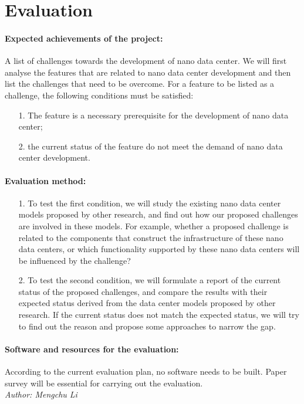 \documentclass[sigchi-a, authorversion]{acmart}
\begin{document}
\section{Evaluation} %

\paragraph{Expected achievements of the project:} A list of challenges towards the development of nano data center.
We will first analyse the features that are related to nano data center development and then list the challenges that need to be overcome. 
For a feature to be listed as a challenge, 
the following conditions must be satisfied:
\begin{enumerate}
\item[1.] The feature is a necessary prerequisite for the development of nano data center;
\item[2.] the current status of the feature do not meet the demand of nano data center development. 
\end{enumerate}

\paragraph{Evaluation method:} 
\begin{enumerate}
\item[1.] To test the first condition, 
we will study the existing nano data center models proposed by other research, 
and find out how our proposed challenges are involved in these models. 
For example, whether a proposed challenge is related to the components that construct the infrastructure of these nano data centers,
or which functionality supported by these nano data centers will be influenced by the challenge?
\item[2.] To test the second condition,
we will formulate a report of the current status of the proposed challenges,
and compare the results with their expected status derived from the data center models proposed by other research.
If the current status does not match the expected status,
we will try to find out the reason and propose some approaches to narrow the gap.
\end{enumerate}

\paragraph{Software and resources for the evaluation:}
According to the current evaluation plan, no software needs to be built. Paper survey will be essential for carrying out the evaluation.\\
\textit{Author: Mengchu Li} \\
\end{document}
